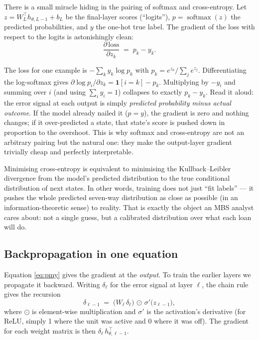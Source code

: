 \documentclass[11pt]{article}
\newcommand{\softmax}{\operatorname{softmax}}
\newcommand{\T}{^{\top}}
\begin{document}
There is a small miracle hiding in the pairing of softmax and cross-entropy. Let $z = W_L\T
h_{\theta,L-1}+b_L$ be the final-layer scores (``logits''), $p = \softmax(z)$ the predicted
probabilities, and $y$ the one-hot true label. The gradient of the loss with respect to the
logits is astonishingly clean:
\begin{equation}
  \frac{\partial\,\text{loss}}{\partial z_k} \;=\; p_k - y_k.
  \label{eq:pmy}
\end{equation}

\begin{derivation}
The loss for one example is $-\sum_k y_k \log p_k$ with
$p_k = e^{z_k}/\sum_j e^{z_j}$. Differentiating the log-softmax gives
$\partial \log p_i/\partial z_k = \mathbf{1}[i=k] - p_k$. Multiplying by $-y_i$ and summing
over $i$ (and using $\sum_i y_i = 1$) collapses to exactly $p_k - y_k$. Read it aloud: the
error signal at each output is simply \emph{predicted probability minus actual outcome}. If
the model already nailed it ($p=y$), the gradient is zero and nothing changes; if it
over-predicted a state, that state's score is pushed down in proportion to the overshoot.
This is why softmax and cross-entropy are not an arbitrary pairing but the natural one: they
make the output-layer gradient trivially cheap and perfectly interpretable.
\end{derivation}

\begin{intuition}
Minimising cross-entropy is equivalent to minimising the Kullback--Leibler divergence from
the model's predicted distribution to the true conditional distribution of next states. In
other words, training does not just ``fit labels'' --- it pushes the whole predicted
seven-way distribution as close as possible (in an information-theoretic sense) to reality.
That is exactly the object an MBS analyst cares about: not a single guess, but a calibrated
distribution over what each loan will do.
\end{intuition}

\subsection{Backpropagation in one equation}

Equation \eqref{eq:pmy} gives the gradient at the \emph{output}. To train the earlier
layers we propagate it backward. Writing $\delta_\ell$ for the error signal at layer
$\ell$, the chain rule gives the recursion
\begin{equation}
  \delta_{\ell-1} \;=\; \bigl(W_\ell\, \delta_\ell\bigr)\,\odot\,\sigma'\!\bigl(z_{\ell-1}\bigr),
  \label{eq:backprop}
\end{equation}
where $\odot$ is element-wise multiplication and $\sigma'$ is the activation's derivative
(for ReLU, simply 1 where the unit was active and 0 where it was off). The gradient for each
weight matrix is then $\delta_\ell\, h_{\theta,\ell-1}\T$.
\end{document}
